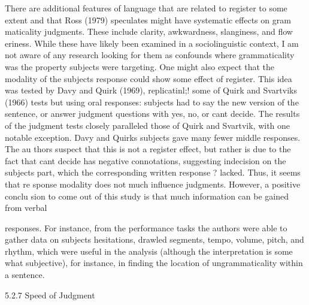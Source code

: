 \begin{styleStandard}
There are additional features of language that are related to register to some extent and that Ross (1979) speculates might have systematic effects on gram\- maticality judgments. These include clarity, awkwardness, slanginess, and flow\- eriness. While these have likely been examined in a sociolinguistic context, I am not aware of any research looking for them as confounds where grammaticality was the property subjects were targeting. One might also expect that the modality of the subjects{\textquotesingle} response could show some effect of register. This idea was tested by Davy and Quirk (1969), replicatinl;! some of Quirk and Svartvik{\textquotesingle}s (1966) tests but using oral responses: subjects had to say the new version of the sentence, or answer judgment questions with {\textquotedbl}yes,{\textquotedbl} {\textquotedbl}no,{\textquotedbl} or {\textquotedbl}can{\textquotesingle}t decide.{\textquotedbl} The results of the judgment tests closely paralleled those of Quirk and Svartvik, with one notable exception. Davy and Quirk{\textquotesingle}s subjects gave many fewer middle responses. The au\- thors suspect that this is not a register effect, but rather is due to the fact that {\textquotedbl}can{\textquotesingle}t decide{\textquotedbl} has negative connotations, suggesting indecision on the subject{\textquotesingle}s part, which the corresponding written response {\textquotedbl}?{\textquotedbl} lacked. Thus, it seems that re\- sponse modality does not much influence judgments. However, a positive conclu\- sion to come out of this study is that much information can be gained from verbal
\end{styleStandard}


\clearpage\setcounter{page}{1}\begin{styleTextbody}
responses. For instance, from the performance tasks the authors were able to gather data on subjects{\textquotesingle} hesitations, drawled segments, tempo, volume, pitch, and rhythm, which were useful in the analysis (although the interpretation is some\- what subjective), for instance, in finding the location of ungrammaticality within a sentence.
\end{styleTextbody}


\begin{styleHeadingviii}
5.2.7 Speed of Judgment
\end{styleHeadingviii}


